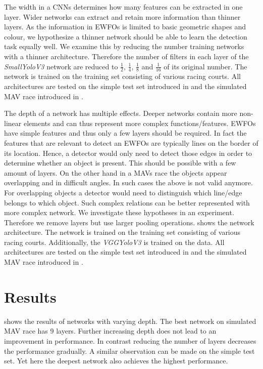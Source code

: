 The width in a \acp{CNN} determines how many features can be extracted in one layer. Wider networks can extract and retain more information than thinner layers. As the information in \acp{EWFO} is limited to basic geometric shapes and colour, we hypothesize a thinner network should be able to learn the detection task equally well. We examine this by reducing the number training networks with a thinner architecture. Therefore the number of filters in each layer of the \textit{SmallYoloV3} network are reduced to $\frac{1}{2}$, $\frac{1}{4}$, $\frac{1}{8}$ and $\frac{1}{16}$ of its original number. The network is trained on the training set consisting of various racing courts. All architectures are tested on the simple test set introduced in  and the simulated \ac{MAV} race introduced in .

The depth of a network has multiple effects. Deeper networks contain more non-linear elements and can thus represent more complex functions/features. \acp{EWFO} have simple features and thus only a few layers should be required. In fact the features that are relevant to detect an \acp{EWFO} are typically lines on the border of its location. Hence, a detector would only need to detect those edges in order to determine whether an object is present. This should be possible with a few amount of layers. On the other hand in a \acp{MAV} race the objects appear overlapping and in difficult angles. In such cases the above is not valid anymore. For overlapping objects a detector would need to distinguish which line/edge belongs to which object. Such complex relations can be better represented with more complex network. We investigate these hypotheses in an experiment. Therefore we remove layers but use larger pooling operations. \todo{} shows the network architecture. The network is trained on the training set consisting of various racing courts. Additionally, the \textit{VGGYoloV3} is trained on the data. All architectures are tested on the simple test set introduced in  and the simulated \ac{MAV} race introduced in .


\section{Results}

 shows the results of networks with varying depth. The best network on simulated \ac{MAV} race has 9 layers. Further increasing depth does not lead to an improvement in performance. In contrast reducing the number of layers decreases the performance gradually. A similar observation can be made on the simple test set. Yet here the deepest network also achieves the highest performance.

